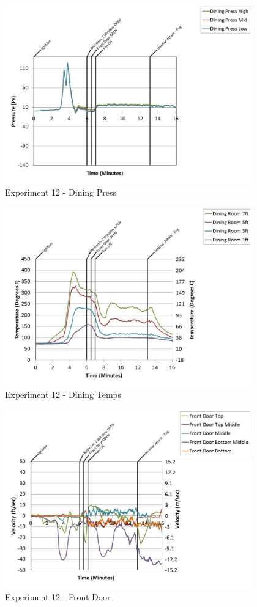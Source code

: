 \documentclass{article}
\begin{document}
\begin{appendices}
	\clearpage

	\begin{figure}[h!]
		\centering
		\includegraphics[height=3.05in]{0_Images/Results_Charts/Exp_12_Charts/DiningPress.pdf}
		\caption{Experiment 12 - Dining Press}
	\end{figure}
 

	\begin{figure}[h!]
		\centering
		\includegraphics[height=3.05in]{0_Images/Results_Charts/Exp_12_Charts/DiningTemps.pdf}
		\caption{Experiment 12 - Dining Temps}
	\end{figure}
 
	\clearpage

	\begin{figure}[h!]
		\centering
		\includegraphics[height=3.05in]{0_Images/Results_Charts/Exp_12_Charts/FrontDoor.pdf}
		\caption{Experiment 12 - Front Door}
	\end{figure}
 


\end{appendices}
\end{document}
